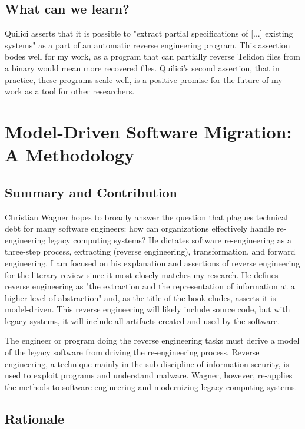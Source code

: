 \documentclass[sigconf]{acmart}
\begin{document}
\subsection{What can we learn?}

Quilici asserts that it is possible to "extract partial specifications of [...] existing systems" as a part of an automatic reverse engineering program. This assertion bodes well for my work, as a program that can partially reverse Telidon files from a binary would mean more recovered files. Quilici's second assertion, that in practice, these programs scale well, is a positive promise for the future of my work as a tool for other researchers. 

\section{Model-Driven Software Migration: A Methodology}


\subsection{Summary and Contribution}

Christian Wagner hopes to broadly answer the question that plagues technical debt for many software engineers: how can organizations effectively handle re-engineering legacy computing systems? He dictates software re-engineering as a three-step process, extracting (reverse engineering), transformation, and forward engineering. I am focused on his explanation and assertions of reverse engineering for the literary review since it most closely matches my research. He defines reverse engineering as "the extraction and the representation of information at a higher level of abstraction" and, as the title of the book eludes, asserts it is model-driven. This reverse engineering will likely include source code, but with legacy systems, it will include all artifacts created and used by the software.

The engineer or program doing the reverse engineering tasks must derive a model of the legacy software from driving the re-engineering process. Reverse engineering, a technique mainly in the sub-discipline of information security, is used to exploit programs and understand malware. Wagner, however, re-applies the methods to software engineering and modernizing legacy computing systems.

\subsection{Rationale}
\end{document}
